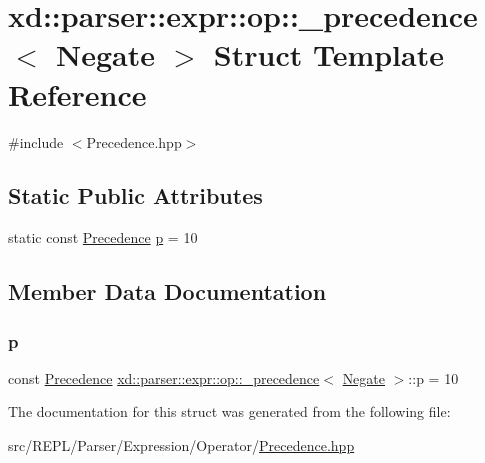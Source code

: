 \hypertarget{structxd_1_1parser_1_1expr_1_1op_1_1__precedence_3_01_negate_01_4}{}\section{xd\+:\+:parser\+:\+:expr\+:\+:op\+:\+:\+\_\+precedence$<$ Negate $>$ Struct Template Reference}
\label{structxd_1_1parser_1_1expr_1_1op_1_1__precedence_3_01_negate_01_4}


{\ttfamily \#include $<$Precedence.\+hpp$>$}

\subsection*{Static Public Attributes}
\begin{DoxyCompactItemize}
\item 
static const \mbox{\hyperlink{namespacexd_1_1parser_1_1expr_1_1op_ae27abd4a02cd8125663cb2bacac299b2}{Precedence}} \mbox{\hyperlink{structxd_1_1parser_1_1expr_1_1op_1_1__precedence_3_01_negate_01_4_ae5ab87fec3e4b1622e9319b9780287cd}{p}} = 10
\end{DoxyCompactItemize}


\subsection{Member Data Documentation}
\mbox{\label{structxd_1_1parser_1_1expr_1_1op_1_1__precedence_3_01_negate_01_4_ae5ab87fec3e4b1622e9319b9780287cd}} 
\subsubsection{\texorpdfstring{p}{p}}
{\footnotesize\ttfamily const \mbox{\hyperlink{namespacexd_1_1parser_1_1expr_1_1op_ae27abd4a02cd8125663cb2bacac299b2}{Precedence}} \mbox{\hyperlink{structxd_1_1parser_1_1expr_1_1op_1_1__precedence}{xd\+::parser\+::expr\+::op\+::\+\_\+precedence}}$<$ \mbox{\hyperlink{structxd_1_1parser_1_1expr_1_1op_1_1_negate}{Negate}} $>$\+::p = 10\hspace{0.3cm}{\ttfamily [static]}}



The documentation for this struct was generated from the following file\+:\begin{DoxyCompactItemize}
\item 
src/\+R\+E\+P\+L/\+Parser/\+Expression/\+Operator/\mbox{\hyperlink{_precedence_8hpp}{Precedence.\+hpp}}\end{DoxyCompactItemize}
